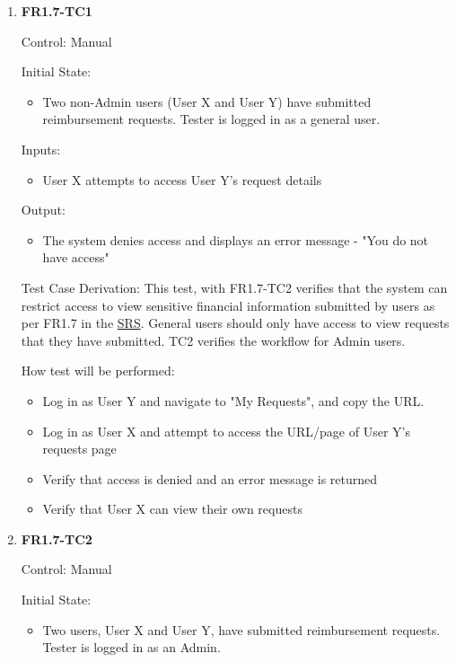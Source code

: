 \documentclass[12pt, titlepage]{article}
\begin{document}
\begin{enumerate}
    \item{\textbf{FR1.7-TC1}}
    \hypertarget{FR1.7-TC1}{}
    
    Control: Manual
    
    Initial State:
    \begin{itemize}
        \item Two non-Admin users (User X and User Y) have submitted reimbursement requests. Tester is logged in as a general user.
    \end{itemize}
    
    Inputs: 
    \begin{itemize}
        \item User X attempts to access User Y's request details
    \end{itemize}
    
    Output: 
    \begin{itemize}
        \item The system denies access and displays an error message - "You do not have access"
    \end{itemize}
    
    Test Case Derivation: This test, with FR1.7-TC2 verifies that the system can restrict access to view sensitive financial information submitted by users as per FR1.7 in the \href{https://shorturl.at/FdAgR}{SRS}. General users should only have access to view requests that they have submitted. TC2 verifies the workflow for Admin users.
    
    How test will be performed:
    \begin{itemize}
        \item Log in as User Y and navigate to "My Requests", and copy the URL.
        \item Log in as User X and attempt to access the URL/page of User Y's requests page
        \item Verify that access is denied and an error message is returned
        \item Verify that User X can view their own requests
    \end{itemize}

    \item{\textbf{FR1.7-TC2}}
    \hypertarget{FR1.7-TC2}{}
    
    Control: Manual
    
    Initial State:
    \begin{itemize}
        \item Two users, User X and User Y, have submitted reimbursement requests. Tester is logged in as an Admin.
    \end{itemize}
    

\end{enumerate}
\end{document}
